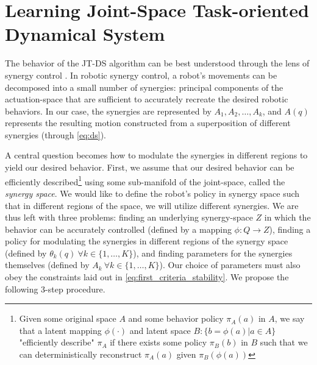 \documentclass[letterpaper, 10 pt, conference,fleqn]{ieeeconf}
\begin{document}

\section{Learning \textbf{J}oint-Space \textbf{T}ask-oriented \textbf{D}ynamical \textbf{S}ystem} 
\label{Sec:Learning}

The behavior of the JT-DS algorithm can be best understood through the lens of synergy control \cite{petrivc2013muscle}. In robotic synergy control, a robot's movements can be decomposed into a small number of synergies: principal components of the actuation-space that are sufficient to accurately recreate the desired robotic behaviors. In our case, the synergies are represented by $A_1, A_2, \dots, A_k$, and $A(q)$ represents the resulting motion constructed from a superposition of different synergies (through \eqref{eq:ds}). 

A central question becomes how to modulate the synergies in different regions to yield our desired behavior. First, we assume that our desired behavior can be efficiently described\footnote{Given some original space $A$ and some behavior policy $\pi_A(a)$ in $A$, we say that a latent mapping $\phi(\cdot)$ and latent space $B: \{b = \phi(a) | a \in A\}$ "efficiently describe" $\pi_A$ if there exists some policy $\pi_B(b)$ in $B$ such that we can deterministically reconstruct $\pi_A(a)$ given $\pi_B(\phi(a))$} using some sub-manifold of the joint-space, called the \emph{synergy space}. We would like to define the robot's policy in synergy space such that in different regions of the space, we will utilize different synergies. We are thus left with three problems: finding an underlying synergy-space $Z$ in which the behavior can be accurately controlled (defined by a mapping $\phi: Q \rightarrow Z$), finding a policy for modulating the synergies in different regions of the synergy space (defined by $\theta_k(q)~\forall k\in\{1,\dots,K\}$), and finding parameters for the synergies themselves (defined by $A_k~\forall k\in\{1,\dots,K\}$). Our choice of parameters must also obey the constraints laid out in \eqref{eq:first_criteria_stability}. We propose the following 3-step procedure.
\end{document}

